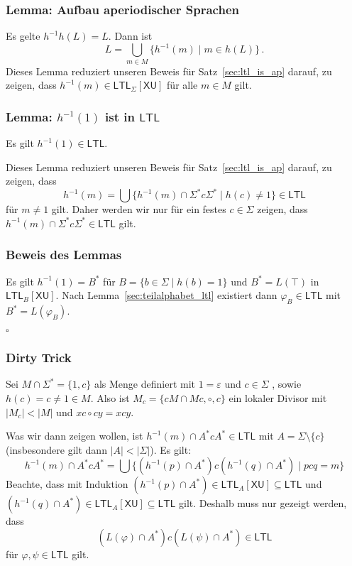 \documentclass[12pt, german]{article}
\newcommand{\sigstern}{\Sigma^\ast}
\newcommand{\inv}{^{-1}}
\newcommand{\aast}{A^{\ast}}
\newcommand{\bast}{B^{\ast}}
\newcommand{\ltl}{\mathsf{LTL}}
\newcommand{\sX}{\mathsf{X}}
\newcommand{\sU}{\mathsf{U}}
\newcommand{\bewiesen}{
	
	\begin{flushright}
		$\square$  \\
\end{flushright}}
\begin{document}
\subsubsection{Lemma: Aufbau aperiodischer Sprachen}
	Es gelte $h\inv h(L) = L$. Dann ist $$L = \bigcup_{m \in M}\{h\inv(m) \mid m \in h(L) \}\, .$$
	Dieses Lemma reduziert unseren Beweis für Satz~\ref{sec:ltl_is_ap} darauf, zu zeigen, dass $h^{-1} (m) \in  \ltl_\Sigma[\sX\sU]$ für alle $m \in M$ gilt. 


\subsubsection{Lemma: $h\inv(1)$ ist in $\ltl$}
	Es gilt $h\inv(1) \in \ltl$.\newline
	
	Dieses Lemma reduziert unseren Beweis für Satz~\ref{sec:ltl_is_ap} darauf, zu zeigen, dass $$h\inv(m) = \bigcup\{h\inv(m) \cap \sigstern c \sigstern \mid h(c) \neq 1\} \in \ltl$$
	für $m \neq 1$ gilt.
	Daher werden wir nur für ein festes $c \in \Sigma$ zeigen, dass $h\inv(m) \cap \sigstern c \sigstern \in \ltl$ gilt.
\subsubsection{Beweis des Lemmas}
	Es gilt $h\inv(1) = \bast$ für $B = \{b \in \Sigma \mid h(b) = 1\}$ und $\bast = L(\top)$ in $ \ltl_B[\sX\sU]$. Nach Lemma~\ref{sec:teilalphabet_ltl} existiert dann $\varphi_B \in \ltl$ mit $\bast = L(\varphi_B)$.
	\bewiesen

\subsubsection{Dirty Trick}
	Sei $M \cap \sigstern = \{1, c\}$ als Menge definiert mit $1 = \varepsilon$ und $c \in \Sigma$ , sowie $h(c) = c \neq 1 \in M$. Also ist $M_c = \{cM\cap Mc, \circ, c\}$ ein lokaler Divisor mit $|M_c| < |M|$ und $xc \circ cy = xcy$. 
	\newline
	
	Was wir dann zeigen wollen, ist $h\inv(m) \cap \aast c \aast \in \ltl$ mit $A = \Sigma \setminus \{c\}$ (insbesondere gilt dann $|A| <| \Sigma|$). 
	Es gilt: $$h\inv(m) \cap \aast c \aast  = \bigcup\{(h\inv(p) \cap \aast)c(h\inv(q)\cap \aast) \mid pcq = m\}$$
	Beachte, dass mit Induktion $(h\inv(p) \cap \aast) \in \ltl_A[\sX\sU] \subseteq \ltl$ und $(h\inv(q)\cap \aast) \in  \ltl_A[\sX\sU]\subseteq \ltl$ gilt.
	Deshalb muss nur gezeigt werden, dass
	$$(L(\varphi) \cap \aast) c (L(\psi) \cap \aast) \in \ltl$$
	für $\varphi, \psi \in \ltl$ gilt.
	
\end{document}

